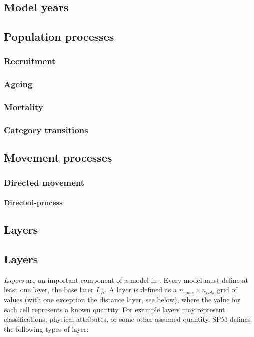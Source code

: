 \subsection{Model years}

\subsection{Population processes}

\subsubsection{Recruitment}

\subsubsection{Ageing}

\subsubsection{Mortality}

\subsubsection{Category transitions}

\subsection{Movement processes}

\subsubsection{Directed movement}

\paragraph{Directed-process}

\subsection{Layers}

\subsection{Layers\label{sec:layers}}

\emph{Layers} are an important component of a model in \SPM. Every model must define at least one layer, the base later $L_B$. A layer is defined as a $n_{rows} \times n_{cols}$ grid of values (with one exception \textemdash the distance layer, see below), where the value for each cell represents a known quantity. For example layers may represent classifications, physical attributes, or some other assumed quantity. SPM defines the following types of layer:

